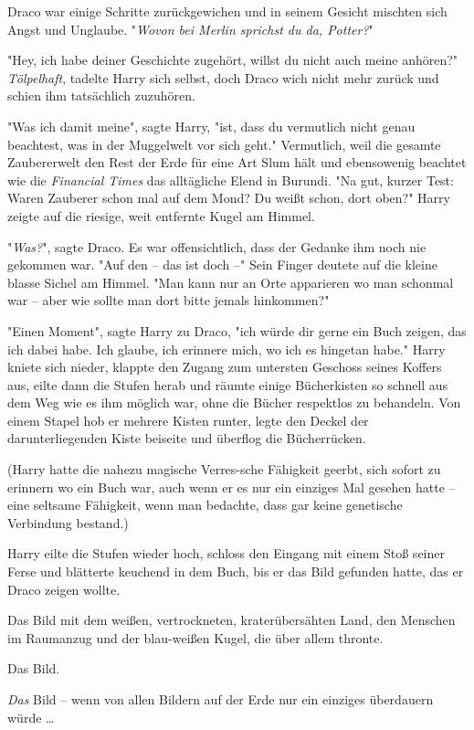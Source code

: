 {Draco war einige Schritte zurückgewichen und in seinem Gesicht mischten sich Angst und Unglaube. "\emph{Wovon bei Merlin sprichst du da, Potter?}"

"Hey, ich habe deiner Geschichte zugehört, willst du nicht auch meine anhören?" \emph{Tölpelhaft}, tadelte Harry sich selbst, doch Draco wich nicht mehr zurück und schien ihm tatsächlich zuzuhören.

"Was ich damit meine", sagte Harry, "ist, dass du vermutlich nicht genau beachtest, was in der Muggelwelt vor sich geht." Vermutlich, weil die gesamte Zaubererwelt den Rest der Erde für eine Art Slum hält und ebensowenig beachtet wie die \emph{Financial Times} das alltägliche Elend in Burundi. "Na gut, kurzer Test: Waren Zauberer schon mal auf dem Mond? Du weißt schon, dort oben?" Harry zeigte auf die riesige, weit entfernte Kugel am Himmel.

"\emph{Was?}", sagte Draco. Es war offensichtlich, dass der Gedanke ihm noch nie gekommen war. "Auf den -- das ist doch --" Sein Finger deutete auf die kleine blasse Sichel am Himmel. "Man kann nur an Orte apparieren wo man schonmal war -- aber wie sollte man dort bitte jemals hinkommen?"

"Einen Moment", sagte Harry zu Draco, "ich würde dir gerne ein Buch zeigen, das ich dabei habe. Ich glaube, ich erinnere mich, wo ich es hingetan habe." Harry kniete sich nieder, klappte den Zugang zum untersten Geschoss seines Koffers aus, eilte dann die Stufen herab und räumte einige Bücherkisten so schnell aus dem Weg wie es ihm möglich war, ohne die Bücher respektlos zu behandeln. Von einem Stapel hob er mehrere Kisten runter, legte den Deckel der darunterliegenden Kiste beiseite und überflog die Bücherrücken.

(Harry hatte die nahezu magische Verres-sche Fähigkeit geerbt, sich sofort zu erinnern wo ein Buch war, auch wenn er es nur ein einziges Mal gesehen hatte -- eine seltsame Fähigkeit, wenn man bedachte, dass gar keine genetische Verbindung bestand.)

Harry eilte die Stufen wieder hoch, schloss den Eingang mit einem Stoß seiner Ferse und blätterte keuchend in dem Buch, bis er das Bild gefunden hatte, das er Draco zeigen wollte.

Das Bild mit dem weißen, vertrockneten, kraterübersähten Land, den Menschen im Raumanzug und der blau-weißen Kugel, die über allem thronte.

Das Bild.

\emph{Das} Bild -- wenn von allen Bildern auf der Erde nur ein einziges überdauern würde …

}
